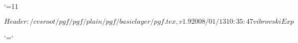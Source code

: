 %
%
%


\edef\pgfatcode{\the\catcode`\@}
\catcode`\@=11



\ProvidesPackageRCS $Header: /cvsroot/pgf/pgf/plain/pgf/basiclayer/pgf.tex,v 1.9 2008/01/13 10:35:47 vibrovski Exp $











\catcode`\@=\pgfatcode

\endinput
